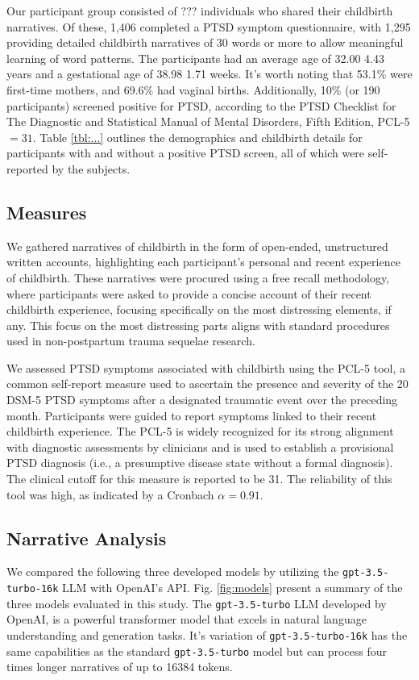 \documentclass[bst/sn-nature]{sn-jnl}%
\theoremstyle{thmstyleone}%
\theoremstyle{thmstyletwo}%
\theoremstyle{thmstylethree}%
\begin{document}
Our participant group consisted of ??? individuals who shared their childbirth narratives. 
Of these, 1,406 completed a PTSD symptom questionnaire, with 1,295 providing detailed childbirth narratives of 30 words or more to allow meaningful learning of word patterns. 
The participants had an average age of 32.00 4.43 years and a gestational age of 38.98 1.71 weeks. 
It's worth noting that 53.1\% were first-time mothers, and 69.6\% had vaginal births. 
Additionally, 10\% (or 190 participants) screened positive for PTSD, according to the PTSD Checklist for The Diagnostic and Statistical Manual of Mental Disorders, Fifth Edition, PCL-5 $=31$. 
Table \ref{tbl:...} outlines the demographics and childbirth details for participants with and without a positive PTSD screen, all of which were self-reported by the subjects.

\subsection{Measures}
We gathered narratives of childbirth in the form of open-ended, unstructured written accounts, highlighting each participant's personal and recent experience of childbirth. These narratives were procured using a free recall methodology, where participants were asked to provide a concise account of their recent childbirth experience, focusing specifically on the most distressing elements, if any. This focus on the most distressing parts aligns with standard procedures used in non-postpartum trauma sequelae research.

We assessed PTSD symptoms associated with childbirth using the PCL-5 tool, a common self-report measure used to ascertain the presence and severity of the 20 DSM-5 PTSD symptoms after a designated traumatic event over the preceding month. 
Participants were guided to report symptoms linked to their recent childbirth experience. The PCL-5 is widely recognized for its strong alignment with diagnostic assessments by clinicians and is used to establish a provisional PTSD diagnosis (i.e., a presumptive disease state without a formal diagnosis).
The clinical cutoff for this measure is reported to be 31.
The reliability of this tool was high, as indicated by a Cronbach $\alpha =0.91$.

\subsection{Narrative Analysis}
We compared the following three developed models by utilizing the \texttt{gpt-3.5-turbo-16k} LLM with OpenAI's API. Fig. \ref{fig:models} present a summary of the three models evaluated in this study.
The \texttt{gpt-3.5-turbo} LLM developed by OpenAI, is a powerful transformer model that excels in natural language understanding and generation tasks.
It's variation of \texttt{gpt-3.5-turbo-16k} has the same capabilities as the standard \texttt{gpt-3.5-turbo} model but can process four times longer narratives of up to 16384 tokens.
\end{document}
